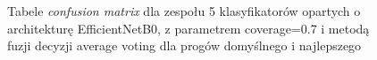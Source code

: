 \documentclass[polish,12pt]{aghthesis}
\begin{document}
\begin{figure}[H]
    \begin{adjustbox}{minipage=1.0\paperwidth, pagecenter}
    \centering
    \qquad
    \end{adjustbox}
    \label{fig:eff-ens-5-0.7-avg-thresh-matrices}
    \caption{Tabele \textit{confusion matrix} dla zespołu 5 klasyfikatorów opartych o architekturę EfficientNetB0, z parametrem coverage=0.7 i metodą fuzji decyzji average voting dla progów domyślnego i najlepszego}
\end{figure}
\end{document}
